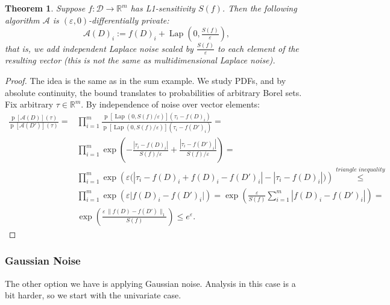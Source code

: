 \documentclass[12pt,letterpaper]{article}
\newcommand{\R}{\mathbb{R}}
\let\eps\varepsilon
\newcommand{\p}{\operatorname{p}}
\newtheorem{theorem}{Theorem}
\newcommand{\Lap}{\operatorname{Lap}}
\begin{document}
\begin{theorem}
  \label{thm:laplacian}
Suppose $f: \mathcal{D} \to \R^m$ has L1-sensitivity $S(f)$. Then the following algorithm $\mathcal{A}$ is $(\eps, 0)$-differentially private:
$$\mathcal{A}(D)_i := f(D)_i + \operatorname{Lap}(0, \tfrac{S(f)}{\eps}),$$
that is, we add independent Laplace noise scaled by $\frac{S(f)}{\eps}$ to each element of the resulting vector (this is not the same as multidimensional Laplace noise).
\end{theorem}
\begin{proof}
  The idea is the same as in the sum example. We study PDFs, and by absolute continuity, the bound translates to probabilities of arbitrary Borel sets. Fix arbitrary $\tau \in \R^m$. By independence of noise over vector elements:
  \begin{align*}
    \frac{\p[\mathcal{A}(D)](\tau)}{\p[\mathcal{A}(D')](\tau)} = 
    &\prod_{i=1}^m \frac{\p[\Lap(0, S(f) / \eps)](\tau_i - f(D)_i)}{\p[\Lap(0, S(f) / \eps)](\tau_i - f(D')_i)} = \\
    &\prod_{i=1}^m \exp\left(-\frac{|\tau_i - f(D)_i|}{S(f)/\eps} + \frac{|\tau_i - f(D')_i|}{S(f)/\eps}\right) = \\
    &\prod_{i=1}^m \exp\left(\eps\big(|\tau_i - f(D)_i + f(D)_i - f(D')_i| - |\tau_i - f(D)_i|\big)\right) \overset{\textit{triangle inequality}}{\leq} \\
    &\prod_{i=1}^m \exp\left(\eps\big|f(D)_i - f(D')_i\big|\right) = \exp\left(\frac{\eps}{S(f)} \sum_{i=1}^m |f(D)_i - f(D')_i|\right) =\\
    &\exp\left(\frac{\eps \, \|f(D) - f(D')\|_1}{S(f)}\right) \leq e^{\eps}.
    \end{align*}
\end{proof}

\subsubsection{Gaussian Noise}

The other option we have is applying Gaussian noise. Analysis in this case is a bit harder, so we start with the univariate case.
\end{document}
